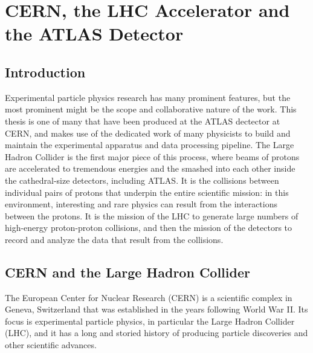  

\chapter[ATLAS Detector]{CERN, the LHC Accelerator and the ATLAS Detector}




\section{Introduction}
Experimental particle physics research has many prominent features, but the most prominent
might be the scope and collaborative nature of the work.  This thesis is one of many that have
been produced at the ATLAS dectector at CERN, and makes use of the dedicated work of many
physicists to build and maintain the experimental apparatus and data processing pipeline.
The Large Hadron Collider is the first major piece of this process, where beams of protons are accelerated to
tremendous energies and the smashed into each other inside the cathedral-size detectors, including ATLAS.
It is the collisions
between individual pairs of protons that underpin the entire scientific mission: in this environment,
interesting and rare physics can result from the interactions between the protons.  It is the mission of the
LHC to generate large numbers of high-energy proton-proton collisions, and then the mission of the detectors
to record and analyze the data that result from the collisions.  



\section{CERN and the Large Hadron Collider}
\label{sec:cern_lhc}
The European Center for Nuclear Research (CERN) is a scientific complex in Geneva, Switzerland that was established 
in the years following World War II.  Its focus is experimental particle physics, in particular the Large Hadron 
Collider (LHC), and it has a long and storied history of producing particle discoveries and other scientific
advances.

